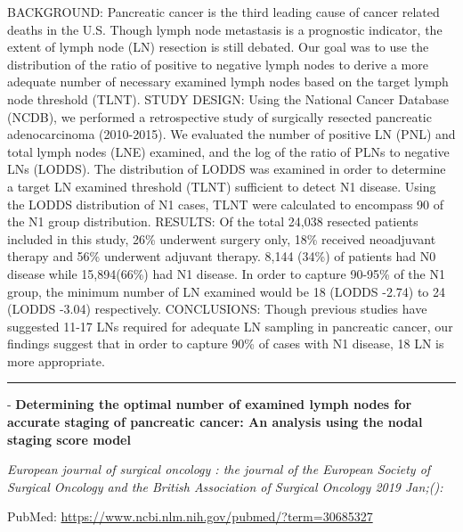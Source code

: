 \documentclass[]{article}
\begin{document}
BACKGROUND: Pancreatic cancer is the third leading cause of cancer
related deaths in the U.S. Though lymph node metastasis is a prognostic
indicator, the extent of lymph node (LN) resection is still debated. Our
goal was to use the distribution of the ratio of positive to negative
lymph nodes to derive a more adequate number of necessary examined lymph
nodes based on the target lymph node threshold (TLNT). STUDY DESIGN:
Using the National Cancer Database (NCDB), we performed a retrospective
study of surgically resected pancreatic adenocarcinoma (2010-2015). We
evaluated the number of positive LN (PNL) and total lymph nodes (LNE)
examined, and the log of the ratio of PLNs to negative LNs (LODDS). The
distribution of LODDS was examined in order to determine a target LN
examined threshold (TLNT) sufficient to detect N1 disease. Using the
LODDS distribution of N1 cases, TLNT were calculated to encompass 90 of
the N1 group distribution. RESULTS: Of the total 24,038 resected
patients included in this study, 26\% underwent surgery only, 18\%
received neoadjuvant therapy and 56\% underwent adjuvant therapy. 8,144
(34\%) of patients had N0 disease while 15,894(66\%) had N1 disease. In
order to capture 90-95\% of the N1 group, the minimum number of LN
examined would be 18 (LODDS -2.74) to 24 (LODDS -3.04) respectively.
CONCLUSIONS: Though previous studies have suggested 11-17 LNs required
for adequate LN sampling in pancreatic cancer, our findings suggest that
in order to capture 90\% of cases with N1 disease, 18 LN is more
appropriate.

{}

{}

\begin{center}\rule{0.5\linewidth}{\linethickness}\end{center}

 - \textbf{Determining the optimal number of examined lymph nodes for
accurate staging of pancreatic cancer: An analysis using the nodal
staging score model}

\emph{European journal of surgical oncology : the journal of the
European Society of Surgical Oncology and the British Association of
Surgical Oncology 2019 Jan;():}

PubMed: \url{https://www.ncbi.nlm.nih.gov/pubmed/?term=30685327}
\end{document}
